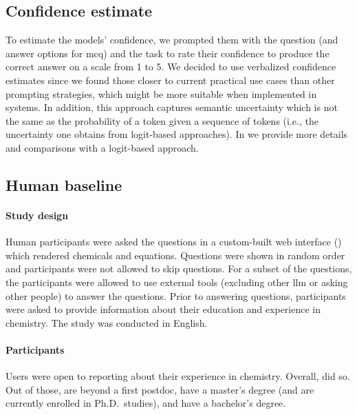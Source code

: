 \documentclass[11pt, oneside]{article}
\begin{document}
\begin{refsection}
\subsection{Confidence estimate}
To estimate the models' confidence, we prompted them with the question (and answer options for \gls{mcq}) and the task to rate their confidence to produce the correct answer on a scale from 1 to 5.
We decided to use verbalized confidence estimates\autocite{xiong2023llms} since we found those closer to current practical use cases than other prompting strategies, which might be more suitable when implemented in systems. In addition, this approach captures semantic uncertainty which is not the same as the probability of a token given a sequence of tokens (i.e., the uncertainty one obtains from logit-based approaches). In  we provide more details and comparisons with a logit-based approach.

\subsection{Human baseline}



\paragraph{Study design}
Human participants were asked the questions in a custom-built web interface () which rendered chemicals and equations. Questions were shown in random order and participants were not allowed to skip questions. For a subset of the questions, the participants were allowed to use external tools (excluding other \gls{llm} or asking other people) to answer the questions. Prior to answering questions, participants were asked to provide information about their education and experience in chemistry. The study was conducted in English.

\paragraph{Participants}
Users were open to reporting about their experience in chemistry.
Overall,  did so.
Out of those,
 are beyond a first postdoc,  have a master's degree (and are currently enrolled in Ph.D.\ studies), and  have a bachelor's degree.



\end{refsection}
\end{document}
